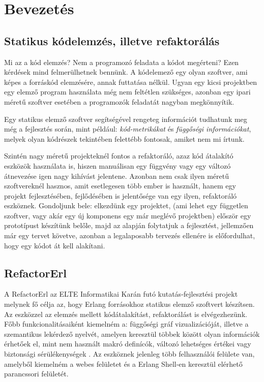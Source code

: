 \chapter{Bevezetés}
\label{ch:intro}

\section{Statikus kódelemzés, illetve refaktorálás}

Mi az a kód elemzés? Nem a programozó feladata a kódot megérteni? Ezen kérdések mind felmerülhetnek bennünk. A kódelemező egy olyan szoftver, ami képes a forráskód elemzésére, annak futtatása nélkül. Ugyan egy kicsi projektben egy elemző program használata még nem feltétlen szükséges, azonban egy ipari méretű szoftver esetében a programozók feladatát nagyban megkönnyítik.

Egy statikus elemző szoftver segítségével rengeteg információt tudhatunk meg még a fejlesztés során, mint például: \textit{kód-metrikákat} és \textit{függőségi információkat}, melyek olyan kódrészek tekintében felettébb fontosak, amiket nem mi írtunk.  

Szintén nagy méretű projekteknél fontos a refaktoráló, azaz kód átalakító eszközök használata is, hiszen manuálisan egy függvény vagy egy változó átnevezése igen nagy kihívást jelentene. Azonban nem csak ilyen méretű szoftvereknél hasznos, amit esetlegesen több ember is használt, hanem egy projekt fejlesztésében, fejlődésében is jelentősége van egy ilyen, refaktoráló eszköznek. Gondoljunk bele: elkezdünk egy projektet, (ami lehet egy független szoftver, vagy akár egy új komponens egy már meglévő projektben) először egy prototípust készítünk belőle, majd az alapján folytatjuk a fejlesztést, jellemzően már egy tervet követve, azonban a legalaposabb tervezés ellenére is előfordulhat, hogy egy kódot át kell alakítani.

\section{RefactorErl}
A RefactorErl az ELTE Informatikai Karán futó kutatás-fejlesztési projekt melynek fő célja az, hogy Erlang forrásokhoz statikus elemző szoftvert készítsen. Az eszközzel az elemzés mellett kódátalakítást, refaktorálást is elvégezhezünk. Főbb funkcionalitásaiként kiemelném a: függőségi gráf vizualizációját, illetve a szemantikus lekérdező nyelvét, amelyen keresztül többek között olyan információk érhetőek el, mint nem használt makró definícók, változó lehetséges értékei vagy biztonsági sérülékenységek \cite{refactorerlSecurity}. Az eszköznek jelenleg több felhasználói felülete van, amelyből kiemelném a webes felületet és a Erlang Shell-en keresztül elérhető parancssori felületét.

